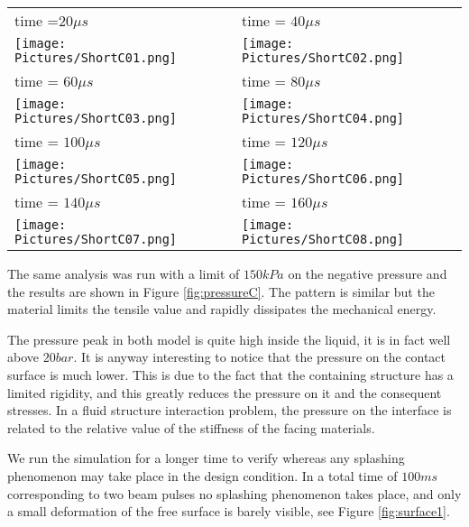\documentclass[a4paper, 11pt, twocolumn]{article}
\begin{document}
\begin{figure*}[t]
\centering
\begin{tabular}{|l|l|}
\hline
\small time =$20 \mu s$ & \small time = $40 \mu s$ \\
\texttt{[image: Pictures/ShortC01.png]} &
\texttt{[image: Pictures/ShortC02.png]} \\
\hline
\small time = $60 \mu s$ & \small time = $80 \mu s$ \\
\texttt{[image: Pictures/ShortC03.png]} &
\texttt{[image: Pictures/ShortC04.png]} \\
\hline
\small time = $100 \mu s$ & \small time = $120 \mu s$ \\
\texttt{[image: Pictures/ShortC05.png]} &
\texttt{[image: Pictures/ShortC06.png]} \\
\hline
\small time = $140 \mu s$ & \small time = $160 \mu s$ \\
\texttt{[image: Pictures/ShortC07.png]} &
\texttt{[image: Pictures/ShortC08.png]} \\
\hline
\end{tabular}
\caption{Pressure distribution [Pa] in the symmetry plane of the target when a material without a tensile limit of $150kPa$ is considered}
\label{fig:pressureC}
\end{figure*}

The same analysis was run with a limit of $150kPa$ on the negative pressure and the results are shown in Figure \ref{fig:pressureC}. The pattern is similar but the material limits the tensile value and rapidly dissipates the mechanical energy.

The pressure peak in both model is quite high inside the liquid, it is in fact well above $20bar$. It is anyway interesting to notice that the pressure on the contact surface is much lower. This is due to the fact that the containing structure has a limited rigidity, and this greatly reduces the pressure on it and the consequent stresses. In a fluid structure interaction problem, the pressure on the interface is related to the relative value of the stiffness of the facing materials.

We run the simulation for a longer time to verify whereas any splashing phenomenon may take place in the design condition. In a total time of $100ms$ corresponding to two beam pulses no splashing phenomenon takes place, and only a small deformation of the free surface is barely visible, see Figure \ref{fig:surface1}.
\end{document}
